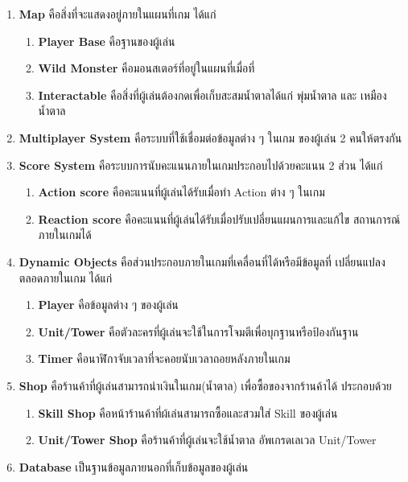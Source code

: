 \documentclass[12pt,oneside,openright,a4paper]{cpe-thai-project}
\begin{document}
\begin{enumerate}
  \item \textbf{Map} คือสิ่งที่จะแสดงอยู่ภายในแผนที่เกม ได้แก่
  \begin{enumerate}
    \item \textbf{Player Base} คือฐานของผู้เล่น
    \item \textbf{Wild Monster} คือมอนสเตอร์ที่อยู่ในแผนที่เมื่อที่
    \item \textbf{Interactable} คือสิ่งที่ผู้เล่นต้องกดเพื่อเก็บสะสมน้ำตาลได้แก่ พุ่มน้ำตาล และ เหมืองน้ำตาล
  \end{enumerate}

  \item \textbf{Multiplayer System} คือระบบที่ใช้เชื่อมต่อข้อมูลต่าง ๆ ในเกม
  ของผู้เล่น 2 คนให้ตรงกัน

  \item \textbf{Score System} คือระบบการนับคะแนนภายในเกมประกอบไปด้วยคะแนน 2 ส่วน ได้แก่
  \begin{enumerate}
    \item \textbf{Action score} คือคะแนนที่ผู้เล่นได้รับเมื่อทำ Action ต่าง ๆ ในเกม
    \item \textbf{Reaction score} คือคะแนนที่ผู้เล่นได้รับเมื่อปรับเปลี่ยนแผนการและแก้ไข
    สถานการณ์ภายในเกมได้
  \end{enumerate}

  \item \textbf{Dynamic Objects} คือส่วนประกอบภายในเกมที่เคลื่อนที่ได้หรือมีข้อมูลที่
  เปลี่ยนแปลงตลอดภายในเกม ได้แก่
  \begin{enumerate}
    \item \textbf{Player} คือข้อมูลต่าง ๆ ของผู้เล่น
    \item \textbf{Unit/Tower} คือตัวละครที่ผู้เล่นจะใช้ในการโจมตีเพื่อบุกฐานหรือป้องกันฐาน
    \item \textbf{Timer} คือนาฬิกาจับเวลาที่จะคอยนับเวลาถอยหลังภายในเกม
  \end{enumerate}
  
  \pagebreak
  \item \textbf{Shop} คือร้านค้าที่ผู้เล่นสามารถนำเงินในเกม(น้ำตาล) 
  เพื่อซื้อของจากร้านค้าได้ ประกอบด้วย
  \begin{enumerate}
    \item \textbf{Skill Shop} คือหน้าร้านค้าที่ผ้เล่นสามารถซื้อและสวมใส่ Skill ของผู้เล่น
    \item \textbf{Unit/Tower Shop} คือร้านค้าที่ผู้เล่นจะใช้น้ำตาล อัพเกรดเลเวล Unit/Tower 
  \end{enumerate}

  \item \textbf{Database} เป็นฐานข้อมูลภายนอกที่เก็บข้อมูลของผู้เล่น
\end{enumerate}
\end{document}
